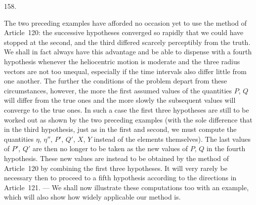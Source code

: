 \par{}\medskip
\hypertarget{native-217-article158}{}
\begin{center}158.\end{center}
The two preceding examples have afforded no occasion yet to use the method of Article~120: the successive hypotheses converged so rapidly that we could have stopped at the second, and the third differed scarcely perceptibly from the truth. We shall in fact always have this advantage and be able to dispense with a fourth hypothesis whenever the heliocentric motion is moderate and the three radius vectors are not too unequal, especially if the time intervals also differ little from one another. The further the conditions of the problem depart from these circumstances, however, the more the first assumed values of the quantities $P$, $Q$ will differ from the true ones and the more slowly the subsequent values will converge to the true ones. In such a case the first three hypotheses are still to be worked out as shown by the two preceding examples (with the sole difference that in the third hypothesis, just as in the first and second, we must compute the
quantities $\eta$, $\eta''$, $P'$, $Q'$, $X$, $Y$ instead of the elements themselves). The last values of $P'$, $Q'$ are then no longer to be taken as the new values of $P$, $Q$ in the fourth hypothesis. These new values are instead to be obtained by the method of Article~120 by combining the first three hypotheses. It will very rarely be necessary then to proceed to a fifth hypothesis according to the directions in Article~121. --- We shall now illustrate these computations too with an example, which will also show how widely applicable our method is.
